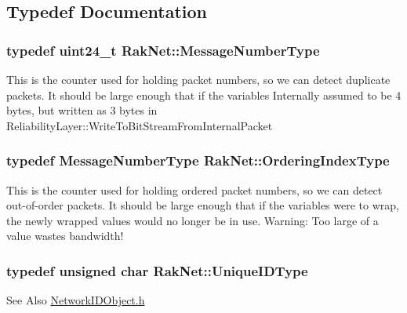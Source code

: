 \subsection{Typedef Documentation}
\hypertarget{namespace_rak_net_a48a622d2efad1d8be8e1fbc5e8e433db}{
\subsubsection[{Message\-Number\-Type}]{\setlength{\rightskip}{0pt plus 5cm}typedef {\bf uint24\-\_\-t} {\bf Rak\-Net\-::\-Message\-Number\-Type}}}\label{namespace_rak_net_a48a622d2efad1d8be8e1fbc5e8e433db}
This is the counter used for holding packet numbers, so we can detect duplicate packets. It should be large enough that if the variables Internally assumed to be 4 bytes, but written as 3 bytes in Reliability\-Layer\-::\-Write\-To\-Bit\-Stream\-From\-Internal\-Packet \hypertarget{namespace_rak_net_a2420990844ae2bee638d55b6834baa75}{
\subsubsection[{Ordering\-Index\-Type}]{\setlength{\rightskip}{0pt plus 5cm}typedef {\bf Message\-Number\-Type} {\bf Rak\-Net\-::\-Ordering\-Index\-Type}}}\label{namespace_rak_net_a2420990844ae2bee638d55b6834baa75}
This is the counter used for holding ordered packet numbers, so we can detect out-\/of-\/order packets. It should be large enough that if the variables were to wrap, the newly wrapped values would no longer be in use. Warning\-: Too large of a value wastes bandwidth! \hypertarget{namespace_rak_net_a707ca8f7aef0ea1fe295e1028af90c8c}{
\subsubsection[{Unique\-I\-D\-Type}]{\setlength{\rightskip}{0pt plus 5cm}typedef unsigned char {\bf Rak\-Net\-::\-Unique\-I\-D\-Type}}}\label{namespace_rak_net_a707ca8f7aef0ea1fe295e1028af90c8c}
\begin{DoxySeeAlso}{See Also}
\hyperlink{_network_i_d_object_8h}{Network\-I\-D\-Object.\-h} 
\end{DoxySeeAlso}


